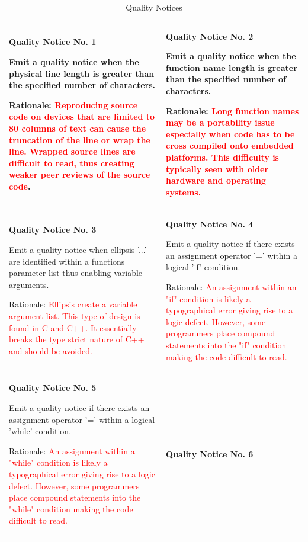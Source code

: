 {\footnotesize\sffamily\centering
  \begin{longtable}{||p{}|p{}||}
  \caption{Quality Notices}\\
    \hline\hline
    \hline\hline
    \endhead
    \hline\hline
    \endfoot
    \textbf{Quality Notice No. 1}

Emit a quality notice when the physical line length is greater than the specified number of characters.

Rationale:  \textcolor{red}{Reproducing source code on devices that are limited to 80 columns of text can cause the truncation of the line or wrap the line.  Wrapped source lines are difficult to read, thus creating weaker peer reviews of the source code}.
& \textbf{Quality Notice No. 2}

Emit a quality notice when the function name length is greater than the specified number of characters.  

Rationale:  \textcolor{red}{Long function names may be a portability issue especially when code has to be cross compiled onto embedded platforms.  This difficulty is typically seen with older hardware and operating systems.}
    \\
    \hline \textbf{Quality Notice No. 3}
    
Emit a quality notice when ellipsis '...' are identified within a functions parameter list thus enabling variable arguments.  

Rationale:  \textcolor{red}{Ellipsis create a variable argument list.  This type of design is found in C and C++.  It essentially breaks the type strict nature of C++ and should be avoided.}
 & \textbf{Quality Notice No. 4}
 
Emit a quality notice if there exists an assignment
operator '=' within a logical 'if' condition.

Rationale:  \textcolor{red}{An assignment within an "if" condition is likely a typographical error giving rise to a logic defect.  However, some programmers place compound statements into the "if" condition making the code difficult to read.}
    \\
    \hline \textbf{Quality Notice No. 5}
    
Emit a quality notice if there exists an assignment
operator '=' within a logical 'while' condition.

Rationale:  \textcolor{red}{An assignment within a "while" condition is likely a typographical error giving rise to a logic defect.  However, some programmers place compound statements into the "while" condition making the code difficult to read.}
 & \textbf{Quality Notice No. 6}
 

\end{longtable}}
